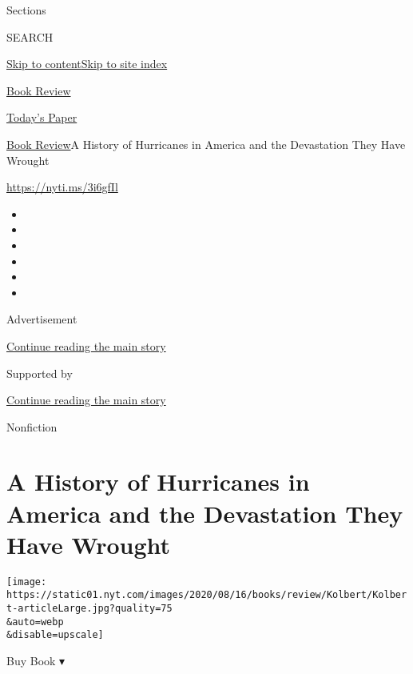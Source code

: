 Sections

SEARCH

\protect\hyperlink{site-content}{Skip to
content}\protect\hyperlink{site-index}{Skip to site index}

\href{https://www.nytimes.com/section/books/review}{Book Review}

\href{https://myaccount.nytimes.com/auth/login?response_type=cookie\&client_id=vi}{}

\href{https://www.nytimes.com/section/todayspaper}{Today's Paper}

\href{/section/books/review}{Book Review}\textbar{}A History of
Hurricanes in America and the Devastation They Have Wrought

\url{https://nyti.ms/3i6gfIl}

\begin{itemize}
\item
\item
\item
\item
\item
\item
\end{itemize}

Advertisement

\protect\hyperlink{after-top}{Continue reading the main story}

Supported by

\protect\hyperlink{after-sponsor}{Continue reading the main story}

Nonfiction

\hypertarget{a-history-of-hurricanes-in-america-and-the-devastation-they-have-wrought}{%
\section{A History of Hurricanes in America and the Devastation They
Have
Wrought}\label{a-history-of-hurricanes-in-america-and-the-devastation-they-have-wrought}}

\texttt{[image: https://static01.nyt.com/images/2020/08/16/books/review/Kolbert/Kolbert-articleLarge.jpg?quality=75\\\&auto=webp\\\&disable=upscale]}

Buy Book ▾

